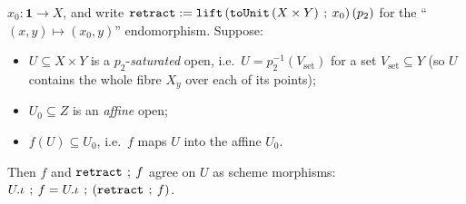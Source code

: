 \begin{lemma}
  \(x_0 \colon \mathbf 1 \to X\), and write \(\mathtt{retract} := \mathtt{lift}\,
  (\mathtt{toUnit}\,(X \times Y) \fatsemi x_0)\,(p_2)\) for the ``\((x, y) \mapsto (x_0, y)\)''
  endomorphism. Suppose:
  \begin{itemize}
    \item \(U \subseteq X \times Y\) is a \(p_2\)-\emph{saturated} open, i.e.\ \(U = p_2^{-1}(V_{\mathrm{set}})\)
      for a set \(V_{\mathrm{set}} \subseteq Y\) (so \(U\) contains the whole fibre \(X_y\) over each of
      its points);
    \item \(U_0 \subseteq Z\) is an \emph{affine} open;
    \item \(f(U) \subseteq U_0\), i.e.\ \(f\) maps \(U\) into the affine \(U_0\).
  \end{itemize}
  Then \(f\) and \(\mathtt{retract} \fatsemi f\) agree on \(U\) as scheme morphisms:
  \(U.\iota \fatsemi f = U.\iota \fatsemi (\mathtt{retract} \fatsemi f)\).
\end{lemma}
